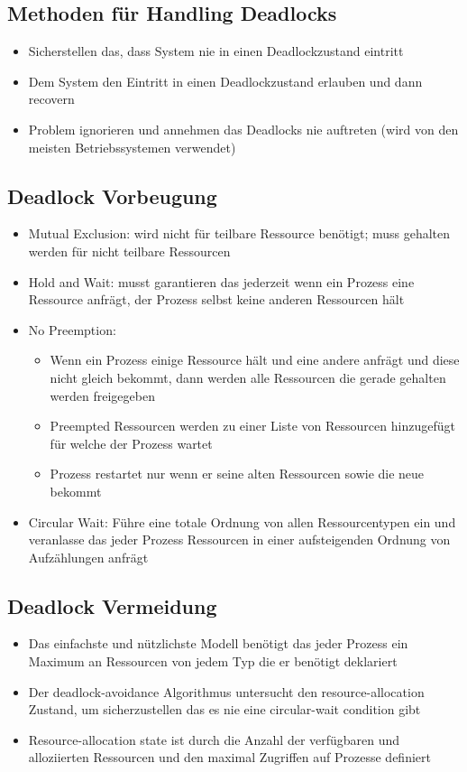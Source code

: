 \documentclass[a4paper]{scrreprt}
\begin{document}
		\subsection{Methoden für Handling Deadlocks}
			\begin{itemize}
				\item Sicherstellen das, dass System nie in einen Deadlockzustand eintritt
				\item Dem System den Eintritt in einen Deadlockzustand erlauben und dann recovern
				\item Problem ignorieren und annehmen das Deadlocks nie auftreten (wird von den meisten Betriebssystemen verwendet)
			\end{itemize}
		\subsection{Deadlock Vorbeugung}
			\begin{itemize}
				\item Mutual Exclusion: wird nicht für teilbare Ressource benötigt; muss gehalten werden für nicht teilbare Ressourcen
				\item Hold and Wait: musst garantieren das jederzeit wenn ein Prozess eine Ressource anfrägt, der Prozess selbst keine anderen Ressourcen hält
				\item No Preemption: 
					\begin{itemize}
						\item Wenn ein Prozess einige Ressource hält und eine andere anfrägt und diese nicht gleich bekommt, dann werden alle Ressourcen die gerade gehalten werden freigegeben
						\item Preempted Ressourcen werden zu einer Liste von Ressourcen hinzugefügt für welche der Prozess wartet
						\item Prozess restartet nur wenn er seine alten Ressourcen sowie die neue bekommt
					\end{itemize}
				\item Circular Wait: Führe eine totale Ordnung von allen Ressourcentypen ein und veranlasse das jeder Prozess Ressourcen in einer aufsteigenden Ordnung von Aufzählungen anfrägt
			\end{itemize}
		
		\subsection {Deadlock Vermeidung}
			\begin{itemize}
				\item Das einfachste und nützlichste Modell benötigt das jeder Prozess ein Maximum an Ressourcen von jedem Typ die er benötigt deklariert
				\item Der deadlock-avoidance Algorithmus untersucht den resource-allocation Zustand, um sicherzustellen das es nie eine circular-wait condition gibt
				\item Resource-allocation state ist durch die Anzahl der verfügbaren und alloziierten Ressourcen und den maximal Zugriffen auf Prozesse definiert 
			\end{itemize}
			
\end{document}
